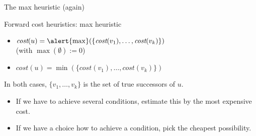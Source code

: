 \documentclass{gkibeamer}
\begin{document}
\begin{frame}{The max heuristic {\hmax} (again)}
  \begin{block}{Forward cost heuristics: max heuristic \hmax}
    \begin{itemize}
    \item $\textit{cost}(u) = \alert{\max} (\{\textit{cost}(v_1), \dots,
      \textit{cost}(v_k)\})$ \\
      (with $\max(\emptyset) := 0$)
    \end{itemize}

    \begin{itemize}
    \item $\textit{cost}(u) = \min(\{\textit{cost}(v_1), \dots,
      \textit{cost}(v_k)\})$
    \end{itemize}

    In both cases, $\{v_1, \dots, v_k\}$ is the set of true
    successors of $u$.
  \end{block}

  \begin{itemize}
  \item {} If we have to achieve several conditions,
    estimate this by the \alert{most expensive} cost.
  \item {} If we have a choice how to achieve a
    condition, pick the \alert{cheapest} possibility.
  \end{itemize}
\end{frame}
\end{document}
